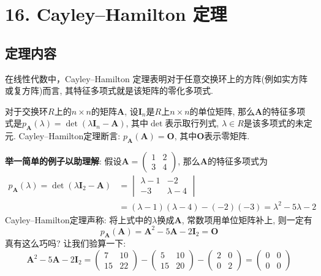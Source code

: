 \documentclass[main]{subfiles}
\begin{document}
\renewcommand{\filename}{16. Cayley–Hamilton 定理}%
\section{16. Cayley–Hamilton 定理}
	\subsection{定理内容}
		在线性代数中，Cayley–Hamilton 定理表明对于任意交换环上的方阵(例如实方阵或复方阵)而言, 其特征多项式就是该矩阵的零化多项式. 
		
		对于交换环$R$上的$n\times n$的矩阵$\boldsymbol{A}$, 设$\boldsymbol{I}_n$是$R$上$n\times n$的单位矩阵, 那么$\boldsymbol{A}$的特征多项式是$p_{\boldsymbol{A}}(\lambda)=\det(\lambda \boldsymbol{I}_n-\boldsymbol{A})$, 其中$\det$表示取行列式, $\lambda\in R$是该多项式的未定元. Cayley–Hamilton定理断言: $p_{\boldsymbol{A}}(\boldsymbol{A})=\boldsymbol{O}$, 其中$\boldsymbol{O}$表示零矩阵.
		
		\textbf{举一简单的例子以助理解}: 假设$\boldsymbol{A}=\begin{pmatrix}
			1 & 2 \\
			3 & 4
		\end{pmatrix}$, 那么$\boldsymbol{A}$的特征多项式为
		\[\begin{aligned}
			p_{\boldsymbol{A}}(\lambda)=\det(\lambda \boldsymbol{I}_2-\boldsymbol{A})&=\begin{vmatrix}
				\lambda-1 & -2 \\
				-3 & \lambda-4
			\end{vmatrix}\\
			&=(\lambda-1)(\lambda-4)-(-2)(-3)=\lambda^{2}-5\lambda-2
		\end{aligned}\]
		Cayley–Hamilton定理声称: 将上式中的$\lambda$换成$\boldsymbol{A}$, 常数项用单位矩阵补上, 则一定有
		\[p_{\boldsymbol{A}}(\boldsymbol{A})=\boldsymbol{A}^2-5\boldsymbol{A}-2\boldsymbol{I}_2=\boldsymbol{O}\]
		真有这么巧吗? 让我们验算一下: 
		\[\boldsymbol{A}^2-5\boldsymbol{A}-2\boldsymbol{I}_2=\begin{pmatrix}
			7 & 10 \\
			15 & 22
		\end{pmatrix}
		-\begin{pmatrix}
			5 & 10 \\
			15 & 20
		\end{pmatrix}
		-\begin{pmatrix}
			2 & 0 \\
			0 & 2
		\end{pmatrix}
		=\begin{pmatrix}
			0 & 0 \\
			0 & 0
		\end{pmatrix}\]
		
\end{document}
